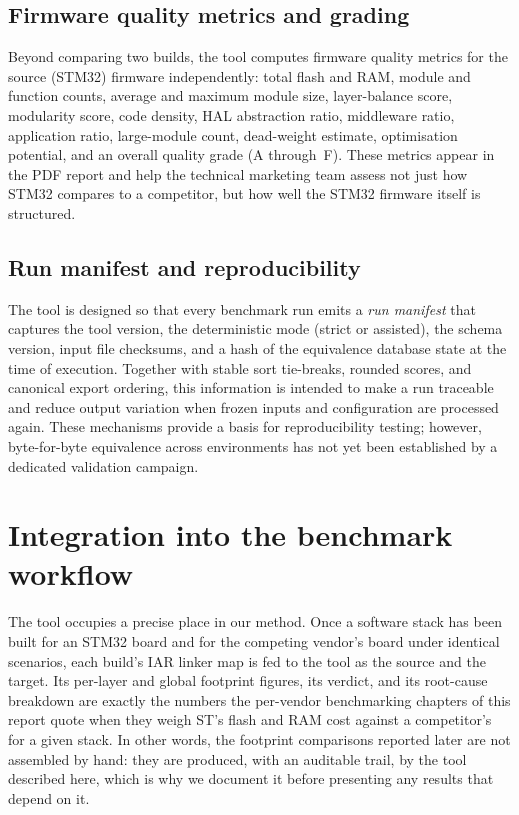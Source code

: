 \subsection{Firmware quality metrics and grading}
\label{sec:tool-quality}

Beyond comparing two builds, the tool computes firmware quality metrics for the source
(STM32) firmware independently: total flash and RAM, module and function counts, average
and maximum module size, layer-balance score, modularity score, code density, HAL
abstraction ratio, middleware ratio, application ratio, large-module count, dead-weight
estimate, optimisation potential, and an overall quality grade (A through~F). These metrics
appear in the PDF report and help the technical marketing team assess not just how STM32
compares to a competitor, but how well the STM32 firmware itself is structured.

\subsection{Run manifest and reproducibility}
\label{sec:tool-manifest}

The tool is designed so that every benchmark run emits a \emph{run manifest} that captures the tool version, the
deterministic mode (strict or assisted), the schema version, input file checksums, and a
hash of the equivalence database state at the time of execution. Together with stable sort
tie-breaks, rounded scores, and canonical export ordering, this information is intended to
make a run traceable and reduce output variation when frozen inputs and configuration are
processed again. These mechanisms provide a basis for reproducibility testing; however,
byte-for-byte equivalence across environments has not yet been established by a dedicated
validation campaign.

\section{Integration into the benchmark workflow}
\label{sec:tool-integration}

The tool occupies a precise place in our method. Once a software stack has been built for an
STM32 board and for the competing vendor's board under identical scenarios, each build's IAR
linker map is fed to the tool as the source and the target. Its per-layer and global footprint
figures, its verdict, and its root-cause breakdown are exactly the numbers the per-vendor
benchmarking chapters of this report quote when they weigh ST's flash and RAM cost against a
competitor's for a given stack. In other words, the footprint comparisons reported later are not
assembled by hand: they are produced, with an auditable trail, by the tool described here, which
is why we document it before presenting any results that depend on it.

